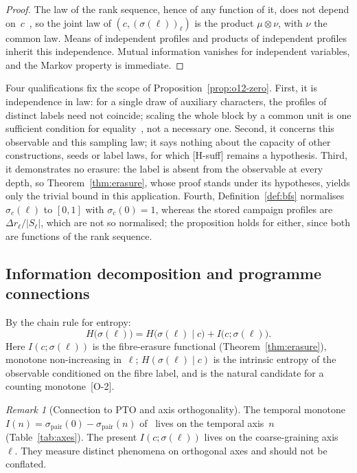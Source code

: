 \documentclass[11pt,a4paper]{article}
\theoremstyle{plain}
\theoremstyle{definition}
\theoremstyle{remark}
\newtheorem{remark}[theorem]{Remark}
\begin{document}
    \begin{proof}
      The law of the rank sequence, hence of any function of it, does not depend
      on~$c$~\cite{Beau2026a36}, so the joint law of
      $(c, (\sigma(\ell))_\ell)$ is the product $\mu \otimes \nu$, with $\nu$ the common law.
      Means of independent profiles and products of independent profiles inherit this
      independence.
      Mutual information vanishes for independent variables, and the Markov property is
      immediate.
    \end{proof}

    Four qualifications fix the scope of Proposition~\ref{prop:o12-zero}.
    First, it is independence in law: for a single draw of auxiliary characters, the profiles
    of distinct labels need not coincide; scaling the whole block by a common unit is one
    sufficient condition for equality~\cite{Beau2026a36}, not a necessary one.
    Second, it concerns this observable and this sampling law; it says nothing about the
    capacity of other constructions, seeds or label laws, for which \textup{[H-suff]} remains a
    hypothesis.
    Third, it demonstrates no erasure: the label is absent from the observable at every
    depth, so Theorem~\ref{thm:erasure}, whose proof stands under its hypotheses, yields only
    the trivial bound in this application.
    Fourth, Definition~\ref{def:bfs} normalises $\sigma_c(\ell)$ to $[0,1]$ with
    $\sigma_c(0) = 1$, whereas the stored campaign profiles are $\Delta r_\ell/|S_\ell|$, which
    are not so normalised; the proposition holds for either, since both are functions of the
    rank sequence.

  \subsection{Information decomposition and programme connections}
  \label{sec:decomp}

  By the chain rule for entropy:
  \begin{equation}
    \label{eq:decomp}
    H\bigl(\sigma(\ell)\bigr)
    = H\bigl(\sigma(\ell) \mid c\bigr) + I\bigl(c;\sigma(\ell)\bigr).
  \end{equation}
  Here $I(c;\sigma(\ell))$ is the fibre-erasure functional (Theorem~\ref{thm:erasure}),
  monotone non-increasing in~$\ell$;
  $H(\sigma(\ell) \mid c)$ is the intrinsic entropy of the observable conditioned on
  the fibre label, and is the natural candidate for a counting monotone~\textup{[O-2]}.

  \begin{remark}[Connection to PTO and axis orthogonality]
    \label{rem:pto}
    The temporal monotone $I(n) = \sigma_{\mathrm{pair}}(0) - \sigma_{\mathrm{pair}}(n)$
    of~\cite{Beau2026pto} lives on the temporal axis~$n$ (Table~\ref{tab:axes}).
    The present $I(c;\sigma(\ell))$ lives on the coarse-graining axis~$\ell$.
    They measure distinct phenomena on orthogonal axes and should not be conflated.
  \end{remark}
\end{document}
